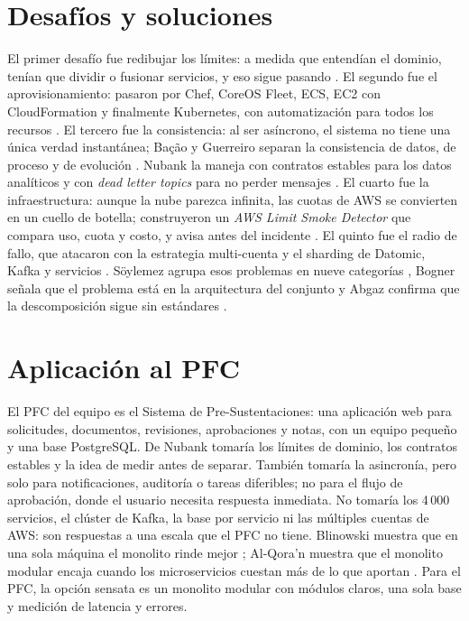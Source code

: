 \documentclass[11pt,a4paper]{article}
\begin{document}
\section{Desafíos y soluciones}
El primer desafío fue redibujar los límites: a medida que entendían el dominio, tenían que dividir o fusionar servicios, y eso sigue pasando \cite{nubank2019microservices}. El segundo fue el aprovisionamiento: pasaron por Chef, CoreOS Fleet, ECS, EC2 con CloudFormation y finalmente Kubernetes, con automatización para todos los recursos \cite{nubank2019microservices}. El tercero fue la consistencia: al ser asíncrono, el sistema no tiene una única verdad instantánea; Bação y Guerreiro separan la consistencia de datos, de proceso y de evolución \cite{bacao2026consistency}. Nubank la maneja con contratos estables para los datos analíticos y con \emph{dead letter topics} para no perder mensajes \cite{nubank2019microservices}. El cuarto fue la infraestructura: aunque la nube parezca infinita, las cuotas de AWS se convierten en un cuello de botella; construyeron un \emph{AWS Limit Smoke Detector} que compara uso, cuota y costo, y avisa antes del incidente \cite{nubank2025limits}. El quinto fue el radio de fallo, que atacaron con la estrategia multi-cuenta y el sharding de Datomic, Kafka y servicios \cite{nubank2025limits}. Söylemez agrupa esos problemas en nueve categorías \cite{soylemez2022challenges}, Bogner señala que el problema está en la arquitectura del conjunto \cite{bogner2021evolvability} y Abgaz confirma que la descomposición sigue sin estándares \cite{abgaz2023decomposition}.

\section{Aplicación al PFC}
El PFC del equipo es el Sistema de Pre-Sustentaciones: una aplicación web para solicitudes, documentos, revisiones, aprobaciones y notas, con un equipo pequeño y una base PostgreSQL. De Nubank tomaría los límites de dominio, los contratos estables y la idea de medir antes de separar. También tomaría la asincronía, pero solo para notificaciones, auditoría o tareas diferibles; no para el flujo de aprobación, donde el usuario necesita respuesta inmediata. No tomaría los 4\,000 servicios, el clúster de Kafka, la base por servicio ni las múltiples cuentas de AWS: son respuestas a una escala que el PFC no tiene. Blinowski muestra que en una sola máquina el monolito rinde mejor \cite{blinowski2022monolithic}; Al-Qora'n muestra que el monolito modular encaja cuando los microservicios cuestan más de lo que aportan \cite{alqoran2025modular}. Para el PFC, la opción sensata es un monolito modular con módulos claros, una sola base y medición de latencia y errores.
\end{document}
